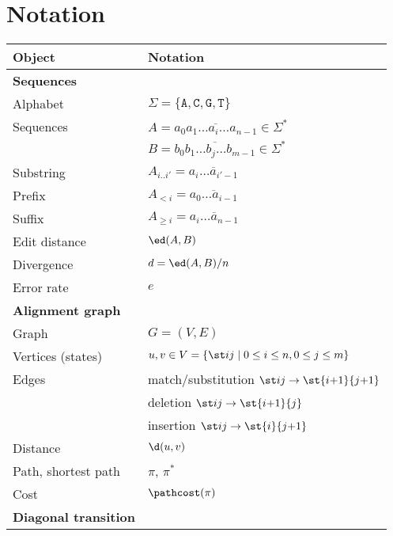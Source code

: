 \newcommand*{\tabindent}{\hspace{2mm}}

\section{Notation}\label{sec:notation}

\begin{minipage}[t]{\columnwidth}
\begin{tabular}[t]{ll}
  \toprule
  \textbf{Object}	         & \textbf{Notation}\\
  \midrule
  \textbf{Sequences}  & \\
  \tabindent Alphabet            	&
									$\Sigma = \{\mathtt A,\mathtt C,\mathtt G,\mathtt T\}$ \\
  \tabindent Sequences            &
									$A = \overline{a_0a_1 \dots a_i \dots a_{n-1}}\in \Sigma^*$\\
							 & $B = \overline{b_0b_1 \dots b_j \dots b_{m-1}} \in \Sigma^*$ \\
  \tabindent Substring          & $A_{i..i'} = \overline{a_i \dots a_{i'-1}}$ \\
  \tabindent Prefix & $A_{< i} = \overline{a_0 \dots a_{i-1}}$ \\
  \tabindent Suffix & $A_{\geq i} = \overline{a_i \dots a_{n-1}}$ \\
  \tabindent Edit distance        & $\ed(A,B)$\\
  \tabindent Divergence        & $d = \ed(A,B) / n$\\
  \tabindent Error rate        & $e$\\
  \midrule
  \textbf{Alignment graph} & \\
  \tabindent Graph& $G=(V,E)$\\
  \tabindent Vertices (states) & $u,v \in V=\{\st ij \mid 0\leq i\leq n, 0\leq j
								 \leq m\}$\\
  \tabindent Edges& match/substitution $\st ij \to \st {i{+}1}{j{+}1}$\\
							 & deletion $\st ij \to \st {i{+}1}{j}$\\
							 & insertion $\st ij \to \st {i}{j{+}1}$\\
  \tabindent Distance & $\d(u, v)$\\
  \tabindent Path, shortest path & $\pi$, $\pi^*$\\
  \tabindent Cost & $\pathcost(\pi)$\\
  \midrule
  \textbf{Diagonal transition} & \\

\end{tabular}
\end{minipage}
